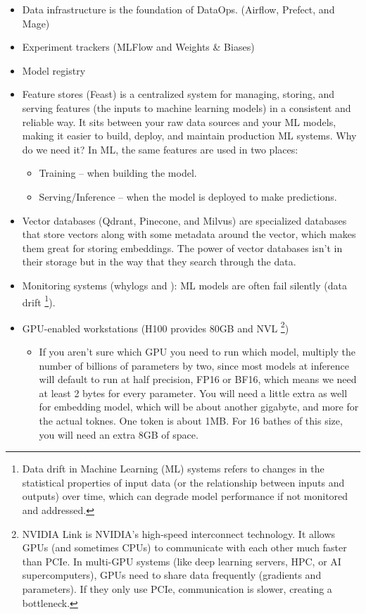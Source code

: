 \begin{itemize}
	\item Data infrastructure is the foundation of DataOps. (\eg Airflow, Prefect, and Mage)  
	\item Experiment trackers (\eg MLFlow and Weights \& Biases)
	\item Model registry 
	\item Feature stores (\eg Feast) is a centralized system for managing, storing, and serving features (the inputs to machine learning models) in a consistent and reliable way. It sits between your raw data sources and your ML models, making it easier to build, deploy, and maintain production ML systems. Why do we need it? In ML, the same features are used in two places:
		\begin{itemize}
			\item Training – when building the model.
			\item Serving/Inference – when the model is deployed to make predictions.
		\end{itemize}
	\item Vector databases (\eg Qdrant, Pinecone, and Milvus) are specialized databases that store vectors along with some metadata around the vector, which makes them great for storing embeddings. The power of vector databases isn't in their storage but in the way that they search through the data. 
	\item Monitoring systems (\eg whylogs and ): ML models are often fail silently (\eg data drift \footnote{Data drift in Machine Learning (ML) systems refers to changes in the statistical properties of input data (or the relationship between inputs and outputs) over time, which can degrade model performance if not monitored and addressed.}). 
	\item GPU-enabled workstations (\eg H100 provides 80GB and NVL \footnote{NVIDIA Link is NVIDIA’s high-speed interconnect technology. It allows GPUs (and sometimes CPUs) to communicate with each other much faster than PCIe. In multi-GPU systems (like deep learning servers, HPC, or AI supercomputers), GPUs need to share data frequently (\eg gradients and parameters). If they only use PCIe, communication is slower, creating a bottleneck.})
		\begin{itemize}
			\item If you aren't sure which GPU you need to run which model, multiply the number of billions of parameters by two, since most models at inference will default to run at half precision, FP16 or BF16, which means we need at least 2 bytes for every parameter. You will need a little extra as well for embedding model, which will be about another gigabyte, and more for the actual toknes. One token is about 1MB. For 16 bathes of this size, you will need an extra 8GB of space. 

\end{itemize}
\end{itemize}
